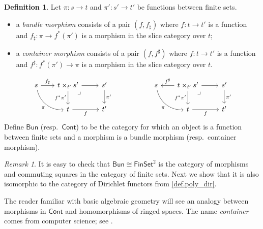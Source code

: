 \documentclass[11pt, article, one side]{memoir}
\theoremstyle{theorem}
\theoremstyle{definition}
\newtheorem{definition}[equation]{Definition}
\theoremstyle{remark}
\newtheorem{remark}[equation]{Remark}
\newcommand{\Cat}[1]{\mathsf{#1}}%
\newcommand{\finset}{\Cat{FinSet}}
\newcommand{\cont}{\Cat{Cont}}
\newcommand{\bun}{\Cat{Bun}}
\begin{document}
\begin{definition}\label{def.sheaves_bundles}
Let $\pi\colon s\to t$ and $\pi'\colon s'\to t'$ be functions between finite sets.
\begin{itemize}
	\item a \emph{bundle morphism} consists of a pair $(f,f_\sharp)$ where $f\colon t\to t'$ is a function and $f_\sharp\colon \pi\to f^*(\pi')$ is a morphism in the slice category over $t$;
	\item a \emph{container morphism} consists of a pair $(f,f^\sharp)$ where $f\colon t\to t'$ is a function and $f^\sharp\colon f^*(\pi')\to \pi$ is a morphism in the slice category over $t$.
\end{itemize}
\begin{equation}\label{eqn.bund_cont_maps}
\begin{tikzcd}
s\ar[dr, bend right=40pt, "\pi"']&[-5pt]
t\times_{t'}s'\ar[r]\ar[d, "f^*\pi'"']\ar[from=l, "f_\sharp"]&
s'\ar[d, "\pi'"]\\&
t\ar[r, "f"']&
t'\ar[ul, phantom, very near end, "\lrcorner"]
\end{tikzcd}
\hspace{.75in}
\begin{tikzcd}
s\ar[dr, bend right=40pt, "\pi"']&[-5pt]
t\times_{t'}s'\ar[r]\ar[d, "f^*\pi'"']\ar[l, "f^\sharp"']&
s'\ar[d, "\pi'"]\\&
t\ar[r, "f"']&
t'\ar[ul, phantom, very near end, "\lrcorner"]
\end{tikzcd}
\end{equation}
Define $\bun$ (resp.\ $\cont$) to be the category for which an object is a function between finite sets and a morphism is a bundle morphism (resp.\ container morphism).
\end{definition}

\begin{remark}
It is easy to check that $\bun\cong\finset^2$ is the category of morphisms and commuting squares in the category of finite sets. Next we show that it is also isomorphic to the category of Dirichlet functors from \cref{def.poly_dir}.

The reader familiar with basic algebraic geometry will see an analogy between morphisms in $\cont$ and homomorphisms of ringed spaces. The name \emph{container} comes from computer science; see \cite{**}.
\end{remark}
\end{document}
